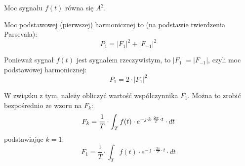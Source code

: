 \begin{task}
Moc sygnału $f(t)$ równa się $A^2$.

Moc podstawowej (pierwszej) harmonicznej to (na podstawie twierdzenia Parsevala):
\begin{equation}
P_1=\left|F_{1}\right|^2+\left|F_{-1}\right|^2
\end{equation}

Ponieważ sygnał $f(t)$ jest sygnałem rzeczywistym, to $\left|F_{1}\right|=\left|F_{-1}\right|$, czyli moc podstawowej harmonicznej: 
\begin{equation}
P_1=2 \cdot \left|F_{1}\right|^2
\end{equation}

W związku z tym, należy obliczyć wartość współczynnika $F_1$. Można to zrobić bezpośrednio ze wzoru na $F_k$:
\begin{equation}
F_k=\frac{1}{T} \cdot \int_{T}f(t) \cdot e^{-\jmath \cdot k \cdot \frac{2\pi}{T} \cdot t} \cdot dt\\
\end{equation}
podstawiając $k=1$:
\begin{equation}
F_1=\frac{1}{T} \cdot \int_{T}f(t) \cdot e^{-\jmath \cdot \frac{2\pi}{T} \cdot t} \cdot dt
\end{equation}


\end{task}
